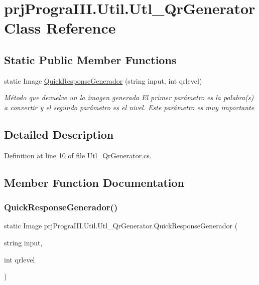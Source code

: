 \hypertarget{classprj_progra_i_i_i_1_1_util_1_1_utl___qr_generator}{}\section{prj\+Progra\+I\+I\+I.\+Util.\+Utl\+\_\+\+Qr\+Generator Class Reference}
\label{classprj_progra_i_i_i_1_1_util_1_1_utl___qr_generator}
\subsection*{Static Public Member Functions}
\begin{DoxyCompactItemize}
\item 
static Image \hyperlink{classprj_progra_i_i_i_1_1_util_1_1_utl___qr_generator_aa38b9204027dbb99f61c2fb0edd24fdf}{Quick\+Response\+Generador} (string input, int qrlevel)
\begin{DoxyCompactList}\small\item\em Método que devuelve un la imagen generada El primer parámetro es la palabra(s) a convertir y el segundo parámetro es el nivel. Este parámetro es muy importante \end{DoxyCompactList}\end{DoxyCompactItemize}


\subsection{Detailed Description}


Definition at line 10 of file Utl\+\_\+\+Qr\+Generator.\+cs.



\subsection{Member Function Documentation}
\hypertarget{classprj_progra_i_i_i_1_1_util_1_1_utl___qr_generator_aa38b9204027dbb99f61c2fb0edd24fdf}{}\label{classprj_progra_i_i_i_1_1_util_1_1_utl___qr_generator_aa38b9204027dbb99f61c2fb0edd24fdf} 
\subsubsection{\texorpdfstring{Quick\+Response\+Generador()}{QuickResponseGenerador()}}
{\footnotesize\ttfamily static Image prj\+Progra\+I\+I\+I.\+Util.\+Utl\+\_\+\+Qr\+Generator.\+Quick\+Response\+Generador (\begin{DoxyParamCaption}\item[{string}]{input,  }\item[{int}]{qrlevel }\end{DoxyParamCaption})\hspace{0.3cm}{\ttfamily [static]}}



